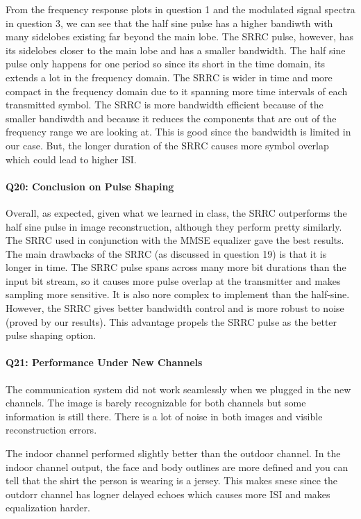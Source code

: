 \documentclass{article}
\begin{document}
From the frequency response plots in question 1 and the modulated signal spectra in question 3, we can see that the half sine pulse has a higher bandiwth with many sidelobes existing far beyond the main lobe. The SRRC pulse, however, has its sidelobes closer to the main lobe and has a smaller bandwidth. The half sine pulse only happens for one period so since its short in the time domain, its extends a lot in the frequency domain. The SRRC is wider in time and more compact in the frequency domain due to it spanning more time intervals of each transmitted symbol. The SRRC is more bandwidth efficient because of the smaller bandiwdth and because it reduces the components that are out of the frequency range we are looking at. This is good since the bandwidth is limited in our case. But, the longer duration of the SRRC causes more symbol overlap which could lead to higher ISI.

\paragraph{Q20: Conclusion on Pulse Shaping}
Overall, as expected, given what we learned in class, the SRRC outperforms the half sine pulse in image reconstruction, although they perform pretty similarly. The SRRC used in conjunction with the MMSE equalizer gave the best results. The main drawbacks of the SRRC (as discussed in question 19) is that it is longer in time. The SRRC pulse spans across many more bit durations than the input bit stream, so it causes more pulse overlap at the transmitter and makes sampling more sensitive. It is also nore complex to implement than the half-sine. However, the SRRC gives better bandwidth control and is more robust to noise (proved by our results). This advantage propels the SRRC pulse as the better pulse shaping option. 

\paragraph{Q21: Performance Under New Channels}
The communication system did not work seamlessly when we plugged in the new channels. The image is barely recognizable for both channels but some information is still there. There is a lot of noise in both images and visible reconstruction errors.

The indoor channel performed slightly better than the outdoor channel. In the indoor channel output, the face and body outlines are more defined and you can tell that the shirt the person is wearing is a jersey. This makes snese since the outdorr channel has logner delayed echoes which causes more ISI and makes equalization harder. 
\end{document}
